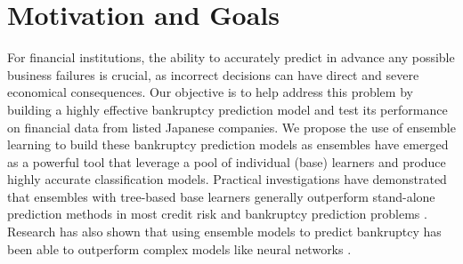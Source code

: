 \section{Motivation and Goals}
For financial institutions, the ability to accurately predict in advance any possible business failures is crucial, as incorrect decisions can have direct and severe economical consequences. Our objective is to help address this problem by building a highly effective bankruptcy prediction model and test its performance on financial data from listed Japanese companies. We propose the use of ensemble learning to build these bankruptcy prediction models as ensembles have emerged as a powerful tool that leverage a pool of individual (base) learners and produce highly accurate classification models.
Practical investigations have demonstrated that ensembles with tree-based base learners generally outperform stand-alone prediction methods in most credit risk and bankruptcy prediction problems \cite{west2005neural,doumpos2007model,alfaro2008bankruptcy,sun2012financial}. 
Research has also shown that using ensemble models to predict bankruptcy has been able to outperform complex models like neural networks \cite{kim2010ensemble}. 









